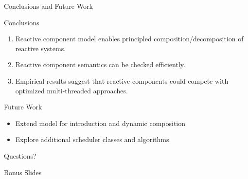\documentclass{beamer}
\begin{document}
\begin{frame}{Conclusions and Future Work}
  \begin{block}{Conclusions}
    \begin{enumerate}
    \item Reactive component model enables principled composition/decomposition of reactive systems.
    \item Reactive component semantics can be checked efficiently.
    \item Empirical results suggest that reactive components could compete with optimized multi-threaded approaches.
    \end{enumerate}
  \end{block}

  \begin{block}{Future Work}
    \begin{itemize}
    \item Extend model for introduction and dynamic composition
    \item Explore additional scheduler classes and algorithms
    \end{itemize}
  \end{block}
\end{frame}

\begin{frame}
  \centering
  \Huge
  Questions?
\end{frame}


\begin{frame}
    \centering
  \Huge
  Bonus Slides
\end{frame}
\end{document}
